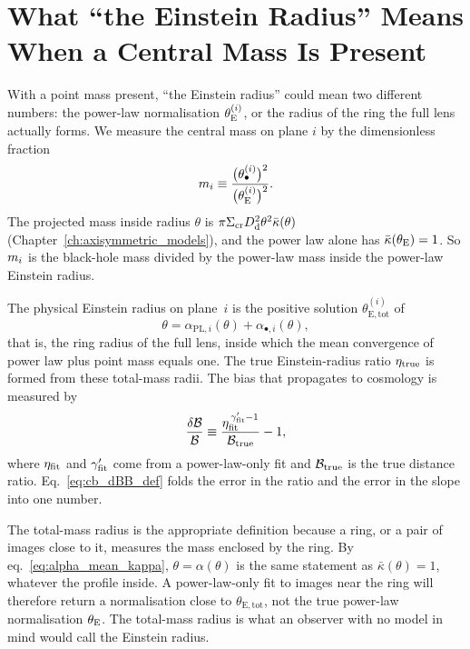 \section{What ``the Einstein Radius'' Means When a Central Mass Is Present}
\label{sec:cb_theta_e}

With a point mass present, ``the Einstein radius'' could mean two
different numbers: the power-law normalisation $\theta_{\mathrm{E}}^{(i)}$, or the
radius of the ring the full lens actually forms. We measure the central
mass on plane $i$ by the dimensionless fraction
\begin{equation}
  m_i \equiv \frac{\big(\theta_{\bullet}^{(i)}\big)^2}{\big(\theta_{\mathrm{E}}^{(i)}\big)^2}.
  \label{eq:cb_m_def}
\end{equation}
The projected mass inside radius $\theta$ is
$\pi\Sigma_{\mathrm{cr}}D_{\mathrm{d}}^2\theta^2\bar\kappa(\theta)$
(Chapter~\ref{ch:axisymmetric_models}), and the power law alone has
$\bar\kappa(\theta_{\mathrm{E}})=1$. So $m_i$ is the black-hole mass divided by
the power-law mass inside the power-law Einstein radius.

\begin{keybox}
The physical Einstein radius on plane~$i$ is the positive solution
$\theta_{\mathrm{E,tot}}^{(i)}$ of
\begin{equation}
  \theta = \alpha_{\mathrm{PL},i}(\theta) + \alpha_{\bullet,i}(\theta),
  \label{eq:cb_thetatot}
\end{equation}
that is, the ring radius of the full lens, inside which the mean
convergence of power law plus point mass equals one. The true
Einstein-radius ratio $\eta_{\rm true}$ is formed from these
total-mass radii. The bias that propagates to cosmology is measured by
\begin{equation}
  \frac{\delta\mathcal{B}}{\mathcal{B}} \equiv
  \frac{\eta_{\rm fit}^{\,\gamma'_{\rm fit}-1}}{\mathcal{B}_{\rm true}} - 1 ,
  \label{eq:cb_dBB_def}
\end{equation}
where $\eta_{\rm fit}$ and $\gamma'_{\rm fit}$ come from a power-law-only
fit and $\mathcal{B}_{\rm true}$ is the true distance ratio.
Eq.~\eqref{eq:cb_dBB_def} folds the error in the ratio and the error in
the slope into one number.
\end{keybox}

The total-mass radius is the appropriate definition because a ring, or
a pair of images close to it, measures the mass enclosed by the ring. By
eq.~\eqref{eq:alpha_mean_kappa}, $\theta=\alpha(\theta)$ is the same
statement as $\bar\kappa(\theta)=1$, whatever the profile inside. A
power-law-only fit to images near the ring will therefore return a
normalisation close to $\theta_{\mathrm{E,tot}}$, not the true
power-law normalisation $\theta_{\mathrm{E}}$. The total-mass radius is what an
observer with no model in mind would call the Einstein radius.

